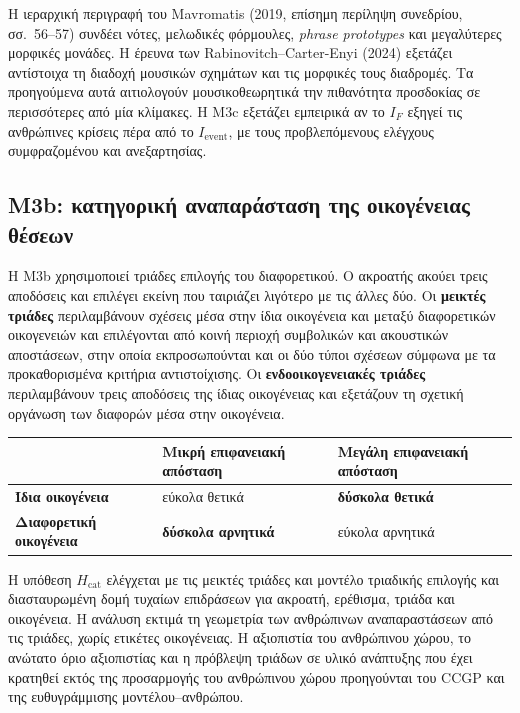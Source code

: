 \documentclass[11pt,a4paper]{article}
\begin{document}
Η ιεραρχική περιγραφή του Mavromatis (2019, επίσημη περίληψη συνεδρίου, σσ.~56--57) συνδέει νότες, μελωδικές φόρμουλες, \emph{phrase prototypes} και μεγαλύτερες μορφικές μονάδες. Η έρευνα των Rabinovitch--Carter-Enyi (2024) εξετάζει αντίστοιχα τη διαδοχή μουσικών σχημάτων και τις μορφικές τους διαδρομές. Τα προηγούμενα αυτά αιτιολογούν μουσικοθεωρητικά την πιθανότητα προσδοκίας σε περισσότερες από μία κλίμακες. Η M3c εξετάζει εμπειρικά αν το $I_F$ εξηγεί τις ανθρώπινες κρίσεις πέρα από το $I_{\mathrm{event}}$, με τους προβλεπόμενους ελέγχους συμφραζομένου και ανεξαρτησίας.

\subsection{M3b: κατηγορική αναπαράσταση της οικογένειας θέσεων}\label{sec:m3b}

Η M3b χρησιμοποιεί τριάδες επιλογής του διαφορετικού. Ο ακροατής ακούει τρεις αποδόσεις και επιλέγει εκείνη που ταιριάζει λιγότερο με τις άλλες δύο. Οι \textbf{μεικτές τριάδες} περιλαμβάνουν σχέσεις μέσα στην ίδια οικογένεια και μεταξύ διαφορετικών οικογενειών και επιλέγονται από κοινή περιοχή συμβολικών και ακουστικών αποστάσεων, στην οποία εκπροσωπούνται και οι δύο τύποι σχέσεων σύμφωνα με τα προκαθορισμένα κριτήρια αντιστοίχισης. Οι \textbf{ενδοοικογενειακές τριάδες} περιλαμβάνουν τρεις αποδόσεις της ίδιας οικογένειας και εξετάζουν τη σχετική οργάνωση των διαφορών μέσα στην οικογένεια.

\begin{center}\small
\begin{tabularx}{0.9\textwidth}{@{}p{}YY@{}}
\toprule
& \textbf{Μικρή επιφανειακή απόσταση} & \textbf{Μεγάλη επιφανειακή απόσταση}\tabularnewline
\midrule
\textbf{Ίδια οικογένεια} & εύκολα θετικά & \textbf{δύσκολα θετικά}\tabularnewline
\midrule
\textbf{Διαφορετική οικογένεια} & \textbf{δύσκολα αρνητικά} & εύκολα αρνητικά\tabularnewline
\bottomrule
\end{tabularx}
\end{center}

Η υπόθεση $H_{\mathrm{cat}}$ ελέγχεται με τις μεικτές τριάδες και μοντέλο τριαδικής επιλογής και διασταυρωμένη δομή τυχαίων επιδράσεων για ακροατή, ερέθισμα, τριάδα και οικογένεια. Η ανάλυση εκτιμά τη γεωμετρία των ανθρώπινων αναπαραστάσεων από τις τριάδες, χωρίς ετικέτες οικογένειας. Η αξιοπιστία του ανθρώπινου χώρου, το ανώτατο όριο αξιοπιστίας και η πρόβλεψη τριάδων σε υλικό ανάπτυξης που έχει κρατηθεί εκτός της προσαρμογής του ανθρώπινου χώρου προηγούνται του CCGP και της ευθυγράμμισης μοντέλου--ανθρώπου.
\end{document}
